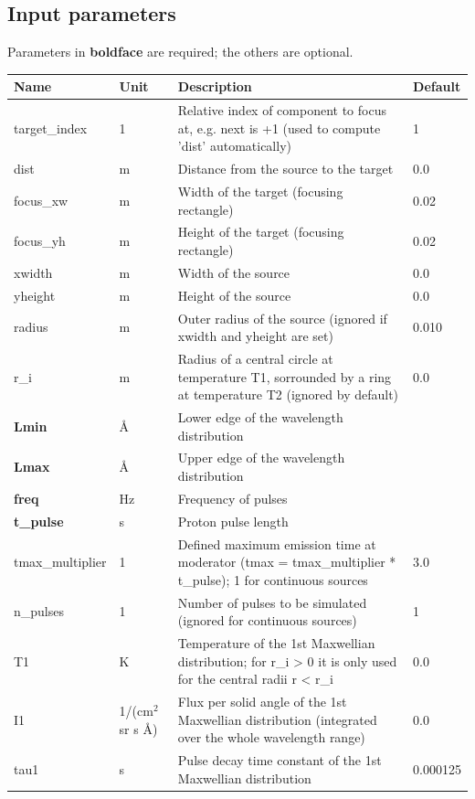 \subsection*{Input parameters}
Parameters in \textbf{boldface} are required; the others are optional.

\begin{longtable}{p{}p{}p{}p{}}
\toprule
\textbf{Name} & \textbf{Unit} & \textbf{Description} & \textbf{Default} \\
\midrule
\endhead
target\_index & 1 & Relative index of component to focus at, e.g. next is +1 (used to compute 'dist' automatically) & 1 \\
dist & m & Distance from the source to the target & 0.0 \\
focus\_xw & m & Width of the target (focusing rectangle) & 0.02 \\
focus\_yh & m & Height of the target (focusing rectangle) & 0.02 \\
xwidth & m & Width of the source & 0.0 \\
yheight & m & Height of the source & 0.0 \\
radius & m & Outer radius of the source (ignored if xwidth and yheight are set) & 0.010 \\
r\_i & m & Radius of a central circle at temperature T1, sorrounded by a ring at temperature T2 (ignored by default) & 0.0 \\
\textbf{Lmin} & \AA{} & Lower edge of the wavelength distribution &  \\
\textbf{Lmax} & \AA{} & Upper edge of the wavelength distribution &  \\
\textbf{freq} & Hz & Frequency of pulses &  \\
\textbf{t\_pulse} & s & Proton pulse length &  \\
tmax\_multiplier & 1 & Defined maximum emission time at moderator (tmax = tmax\_multiplier * t\_pulse); 1 for continuous sources & 3.0 \\
n\_pulses & 1 & Number of pulses to be simulated (ignored for continuous sources) & 1 \\
T1 & K & Temperature of the 1st Maxwellian distribution; for r\_i \textgreater{} 0 it is only used for the central radii r \textless{} r\_i & 0.0 \\
I1 & 1/(cm$^{2}$ sr s \AA{}) & Flux per solid angle of the 1st Maxwellian distribution (integrated over the whole wavelength range) & 0.0 \\
tau1 & s & Pulse decay time constant of the 1st Maxwellian distribution & 0.000125 \\

\end{longtable}
